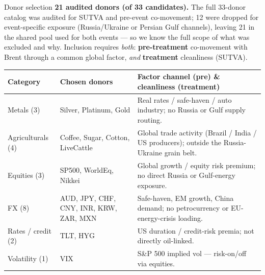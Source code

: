 \documentclass[aspectratio=169,11pt]{beamer}
\newcommand{\hd}[1]{\textbf{#1}}
\begin{document}
\begin{frame}{Donor selection}
  \footnotesize
  \hd{21 audited donors (of 33 candidates).} The full 33-donor catalog was audited for SUTVA and pre-event co-movement; 12 were dropped for event-specific exposure (Russia/Ukraine or Persian Gulf channels), leaving 21 in the shared pool used for both events --- so we know the full scope of what was excluded and why. Inclusion requires \emph{both}: \hd{pre-treatment} co-movement with Brent through a common global factor, \emph{and} \hd{treatment} cleanliness (SUTVA).

  \vspace{0.4em}
  \scriptsize
  \begin{tabular}{@{}p{} p{} p{}@{}}
    \toprule
    \hd{Category}      & \hd{Chosen donors}                                & \hd{Factor channel (pre) \& cleanliness (treatment)} \\
    \midrule
    Metals (3)         & Silver, Platinum, Gold                            & Real rates / safe-haven / auto industry; no Russia or Gulf supply routing. \\
    Agriculturals (4)  & Coffee, Sugar, Cotton, LiveCattle                 & Global trade activity (Brazil / India / US producers); outside the Russia-Ukraine grain belt. \\
    Equities (3)       & SP500, WorldEq, Nikkei                            & Global growth / equity risk premium; no direct Russia or Gulf-energy exposure. \\
    FX (8)             & AUD, JPY, CHF, CNY, INR, KRW, ZAR, MXN            & Safe-haven, EM growth, China demand; no petrocurrency or EU-energy-crisis loading. \\
    Rates / credit (2) & TLT, HYG                                          & US duration / credit-risk premia; not directly oil-linked. \\
    Volatility (1)     & VIX                                               & S\&P 500 implied vol --- risk-on/off via equities. \\
    \bottomrule
  \end{tabular}
  \normalsize

  \vspace{0.4em}
\end{frame}
\end{document}
